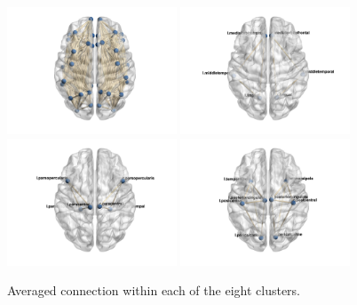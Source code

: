 \documentclass[11pt]{article}
\theoremstyle{plain}
\theoremstyle{definition}
\begin{document}
\begin{figure}[H]
  \centering
 \includegraphics[width = 0.45\textwidth]{brain1.jpg}
 \includegraphics[width = 0.45\textwidth]{brain2.jpg}
 \includegraphics[width = 0.45\textwidth]{brain3.jpg}
 \includegraphics[width = 0.45\textwidth]{brain4.jpg}
  \label{figure:brain image}
  \caption{Averaged connection within each of the eight clusters. }
\end{figure}



\end{document}

